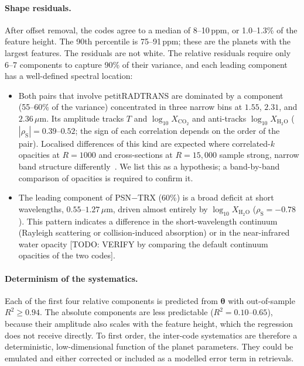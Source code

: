 \paragraph{Shape residuals.}
After offset removal, the codes agree to a median of 8--10\,ppm, or 1.0--1.3\% of the feature height.
The 90th percentile is 75--91\,ppm; these are the planets with the largest features.
The residuals are not white.
The relative residuals require only 6--7 components to capture 90\% of their variance, and each leading component has a well-defined spectral location:
\begin{itemize}
  \item Both pairs that involve petitRADTRANS are dominated by a component (55--60\% of the variance) concentrated in three narrow bins at $1.55$, $2.31$, and $2.36\,\mu$m.
  Its amplitude tracks $T$ and $\log_{10}X_{\mathrm{CO_2}}$ and anti-tracks $\log_{10}X_{\mathrm{H_2O}}$ ($|\rho_{\mathrm{S}}|=0.39$--$0.52$; the sign of each correlation depends on the order of the pair).
  Localised differences of this kind are expected where correlated-$k$ opacities at $R=1000$ and cross-sections at $R=15{,}000$ sample strong, narrow band structure differently~\cite{TODO_correlated_k_vs_line_by_line_accuracy}.
  We list this as a hypothesis; a band-by-band comparison of opacities is required to confirm it.
  \item The leading component of PSN$-$TRX (60\%) is a broad deficit at short wavelengths, $0.55$--$1.27\,\mu$m, driven almost entirely by $\log_{10}X_{\mathrm{H_2O}}$ ($\rho_{\mathrm{S}}=-0.78$).
  This pattern indicates a difference in the short-wavelength continuum (Rayleigh scattering or collision-induced absorption) or in the near-infrared water opacity [TODO: VERIFY by comparing the default continuum opacities of the two codes].
\end{itemize}

\paragraph{Determinism of the systematics.}
Each of the first four relative components is predicted from $\bm{\theta}$ with out-of-sample $R^2\geq0.94$.
The absolute components are less predictable ($R^2=0.10$--$0.65$), because their amplitude also scales with the feature height, which the regression does not receive directly.
To first order, the inter-code systematics are therefore a deterministic, low-dimensional function of the planet parameters.
They could be emulated and either corrected or included as a modelled error term in retrievals.


